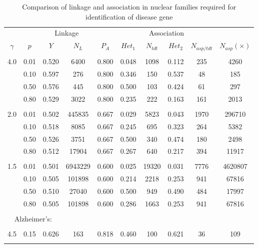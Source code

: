 \begin{table}[h]
\centering
\caption{Comparison of linkage and association in nuclear
families required for identification of disease gene\label{table7_1}}
\vskip 0.3cm
\begin{tabular}{cccccccccc}
\hline
&&\multicolumn{2}{c}{Linkage}&&\multicolumn{4}{c}{Association} \\
\cline{3-4} \cline{6-9}
$\gamma$& $p$ &$Y$ & $N_{L}$
& $P_A$& $Het_1$ &  $N_{tdt}$ & $Het_2$ &$N_{asp/tdt}$ & $N_{asp}(\times)$
\\
\hline
\\
 4.0&0.01& 0.520&     6400& 0.800& 0.048&   1098&0.112&    235&       4260\\
 &0.10& 0.597&      276& 0.800& 0.346&    150&0.537&     48&        185\\
 &0.50& 0.576&      445& 0.800& 0.500&    103&0.424&     61&        297\\
 &0.80& 0.529&     3022& 0.800& 0.235&    222&0.163&    161&       2013\\
\\
 2.0&0.01& 0.502&   445835& 0.667& 0.029&   5823&0.043&   1970&     296710\\
 &0.10& 0.518&     8085& 0.667& 0.245&    695&0.323&    264&       5382\\
 &0.50& 0.526&     3751& 0.667& 0.500&    340&0.474&    180&       2498\\
 &0.80& 0.512&    17904& 0.667& 0.267&    640&0.217&    394&      11917\\
\\
 1.5&0.01& 0.501&  6943229& 0.600& 0.025&  19320&0.031&   7776&    4620807\\
 &0.10& 0.505&   101898& 0.600& 0.214&   2218&0.253&    941&      67816\\
 &0.50& 0.510&    27040& 0.600& 0.500&    949&0.490&    484&      17997\\
 &0.80& 0.505&   101898& 0.600& 0.286&   1663&0.253&    941&      67816\\
\\
\multicolumn{3}{c}{Alzheimer's:}\\
\\
 4.5&0.15& 0.626&      163& 0.818& 0.460&    100&0.621&     36&        109\\
\\
\hline
\end{tabular}
\end{table}

